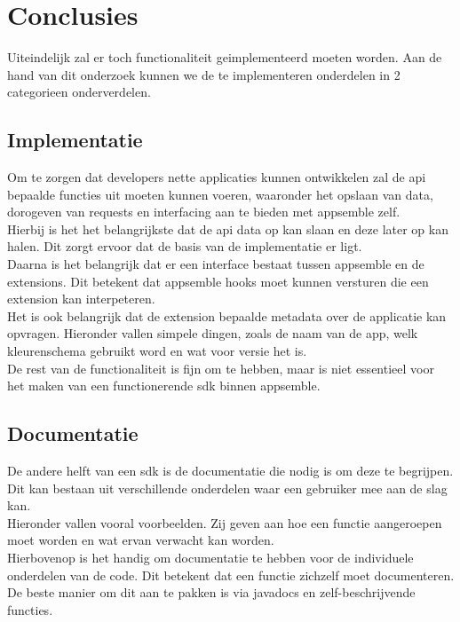 \chapter{Conclusies}

Uiteindelijk zal er toch functionaliteit geimplementeerd moeten worden. Aan de hand van dit onderzoek kunnen we de te implementeren onderdelen in 2 categorieen onderverdelen.

\section{Implementatie}

Om te zorgen dat developers nette applicaties kunnen ontwikkelen zal de api bepaalde functies uit moeten kunnen voeren, waaronder het opslaan van data, dorogeven van requests en interfacing aan te bieden met appsemble zelf. \\

Hierbij is het het belangrijkste dat de api data op kan slaan en deze later op kan halen. Dit zorgt ervoor dat de basis van de implementatie er ligt. \\

Daarna is het belangrijk dat er een interface bestaat tussen appsemble en de extensions. Dit betekent dat appsemble hooks moet kunnen versturen die een extension kan interpeteren. \\

Het is ook belangrijk dat de extension bepaalde metadata over de applicatie kan opvragen. Hieronder vallen simpele dingen, zoals de naam van de app, welk kleurenschema gebruikt word en wat voor versie het is. \\

De rest van de functionaliteit is fijn om te hebben, maar is niet essentieel voor het maken van een functionerende sdk binnen appsemble. 

\section{Documentatie}

De andere helft van een sdk is de documentatie die nodig is om deze te begrijpen. Dit kan bestaan uit verschillende onderdelen waar een gebruiker mee aan de slag kan. \\

Hieronder vallen vooral voorbeelden. Zij geven aan hoe een functie aangeroepen moet worden en wat ervan verwacht kan worden. \\

Hierbovenop is het handig om documentatie te hebben voor de individuele onderdelen van de code. Dit betekent dat een functie zichzelf moet documenteren. De beste manier om dit aan te pakken is via javadocs en zelf-beschrijvende functies.